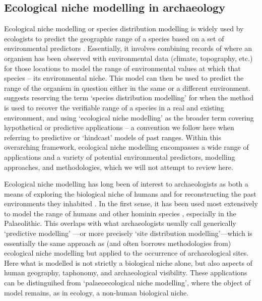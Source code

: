 \documentclass[
  authoryear,
  preprint]{elsarticle}
\begin{document}
\subsection{Ecological niche modelling in
archaeology}\label{ecological-niche-modelling-in-archaeology}

Ecological niche modelling or species distribution modelling is widely
used by ecologists to predict the geographic range of a species based on
a set of environmental predictors \citep{FranklinMiller2009}.
Essentially, it involves combining records of where an organism has been
observed with environmental data (climate, topography, etc.) for those
locations to model the range of environmental values at which that
species -- its environmental niche. This model can then be used to
predict the range of the organism in question either in the same or a
different environment. \citet{CITE} suggests reserving the term `species
distribution modelling' for when the method is used to recover the
verifiable range of a species in a real and existing environment, and
using `ecological niche modelling' as the broader term covering
hypothetical or predictive applications -- a convention we follow here
when referring to predictive or `hindcast' models of past ranges. Within
this overarching framework, ecological niche modelling encompasses a
wide range of applications and a variety of potential environmental
predictors, modelling approaches, and methodologies, which we will not
attempt to review here.

Ecological niche modelling has long been of interest to archaeologists
as both a means of exploring the biological niche of humans and for
reconstructing the past environments they inhabited
\citep{DavidPollyEronen2011, FranklinEtAl2015}. In the first sense, it
has been used most extensively to model the range of humans and other
hominin species
\citep[e.g.][]{BenitoEtAl2017, YousefiEtAl2020, BanksEtAl2021, YaworskyEtAl2024a, YaworskyEtAl2024b, GuranEtAl2024},
especially in the Palaeolithic. This overlaps with what archaeologists
usually call generically `predictive modelling'
\citep{VerhagenWhitley2020}---or more precisely `site distribution
modelling'---which is essentially the same approach as (and often
borrows methodologies from) ecological niche modelling but applied to
the occurrence of archaeological sites. Here what is modelled is not
strictly a biological niche alone, but also aspects of human geography,
taphonomy, and archaeological visibility. These applications can be
distinguihed from `palaeoecological niche modelling', where the object
of model remains, as in ecology, a non-human biological niche.
\end{document}
